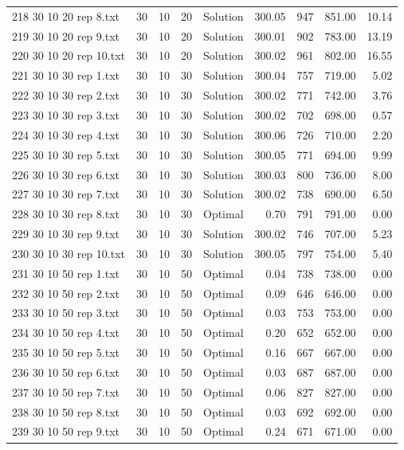 \begin{longtable}{lrrllrrrr}
218 30 10 20 rep 8.txt & 30 & 10 & 20 & Solution & 300.05 & 947 & 851.00 & 10.14\\
219 30 10 20 rep 9.txt & 30 & 10 & 20 & Solution & 300.01 & 902 & 783.00 & 13.19\\
220 30 10 20 rep 10.txt & 30 & 10 & 20 & Solution & 300.02 & 961 & 802.00 & 16.55\\
221 30 10 30 rep 1.txt & 30 & 10 & 30 & Solution & 300.04 & 757 & 719.00 &  5.02\\
222 30 10 30 rep 2.txt & 30 & 10 & 30 & Solution & 300.02 & 771 & 742.00 &  3.76\\
223 30 10 30 rep 3.txt & 30 & 10 & 30 & Solution & 300.02 & 702 & 698.00 &  0.57\\
224 30 10 30 rep 4.txt & 30 & 10 & 30 & Solution & 300.06 & 726 & 710.00 &  2.20\\
225 30 10 30 rep 5.txt & 30 & 10 & 30 & Solution & 300.05 & 771 & 694.00 &  9.99\\
226 30 10 30 rep 6.txt & 30 & 10 & 30 & Solution & 300.03 & 800 & 736.00 &  8.00\\
227 30 10 30 rep 7.txt & 30 & 10 & 30 & Solution & 300.02 & 738 & 690.00 &  6.50\\
228 30 10 30 rep 8.txt & 30 & 10 & 30 & Optimal &  0.70 & 791 & 791.00 &  0.00\\
229 30 10 30 rep 9.txt & 30 & 10 & 30 & Solution & 300.02 & 746 & 707.00 &  5.23\\
230 30 10 30 rep 10.txt & 30 & 10 & 30 & Solution & 300.05 & 797 & 754.00 &  5.40\\
231 30 10 50 rep 1.txt & 30 & 10 & 50 & Optimal &  0.04 & 738 & 738.00 &  0.00\\
232 30 10 50 rep 2.txt & 30 & 10 & 50 & Optimal &  0.09 & 646 & 646.00 &  0.00\\
233 30 10 50 rep 3.txt & 30 & 10 & 50 & Optimal &  0.03 & 753 & 753.00 &  0.00\\
234 30 10 50 rep 4.txt & 30 & 10 & 50 & Optimal &  0.20 & 652 & 652.00 &  0.00\\
235 30 10 50 rep 5.txt & 30 & 10 & 50 & Optimal &  0.16 & 667 & 667.00 &  0.00\\
236 30 10 50 rep 6.txt & 30 & 10 & 50 & Optimal &  0.03 & 687 & 687.00 &  0.00\\
237 30 10 50 rep 7.txt & 30 & 10 & 50 & Optimal &  0.06 & 827 & 827.00 &  0.00\\
238 30 10 50 rep 8.txt & 30 & 10 & 50 & Optimal &  0.03 & 692 & 692.00 &  0.00\\
239 30 10 50 rep 9.txt & 30 & 10 & 50 & Optimal &  0.24 & 671 & 671.00 &  0.00\\

\end{longtable}
